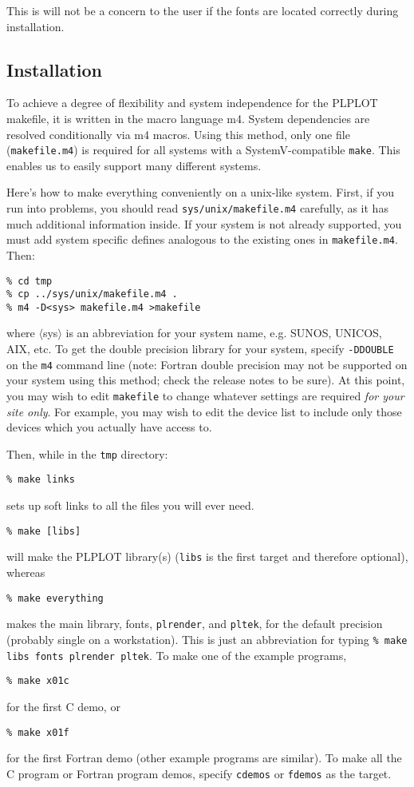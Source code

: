 This is will not be a concern to the user if the fonts are located correctly
during installation.


\subsection{Installation}

To achieve a degree of flexibility and system independence for the PLPLOT
makefile, it is written in the macro language m4.  System dependencies are
resolved conditionally via m4 macros.  Using this method, only one file
({\tt makefile.m4}) is required for all systems with a SystemV-compatible
{\tt make}.  This enables us to easily support many different systems.

Here's how to make everything conveniently on a unix-like system.  First,
if you run into problems, you should read {\tt sys/unix/makefile.m4}
carefully, as it has much additional information inside.  If your system is
not already supported, you must add system specific defines analogous to
the existing ones in {\tt makefile.m4}.  Then: 
\begin{verbatim}
% cd tmp
% cp ../sys/unix/makefile.m4 .
% m4 -D<sys> makefile.m4 >makefile 
\end{verbatim}
where $\langle$sys$\rangle$ is an abbreviation for your system name, e.g.
SUNOS, UNICOS, AIX, etc.  To get the double precision library for your
system, specify {\tt -DDOUBLE} on the {\tt m4} command line (note: Fortran
double precision may not be supported on your system using this method;
check the release notes to be sure).  At this point, you may wish to edit
{\tt makefile} to change whatever settings are required {\em for your site
only}.  For example, you may wish to edit the device list to include only
those devices which you actually have access to. 

Then, while in the {\tt tmp} directory:
%
\begin{verbatim}
% make links
\end{verbatim}
%
sets up soft links to all the files you will ever need.
%
\begin{verbatim}
% make [libs]
\end{verbatim}
%
will make the PLPLOT library(s) ({\tt libs} is the first target and
therefore optional), whereas
%
\begin{verbatim}
% make everything
\end{verbatim}
%
makes the main library, fonts, {\tt plrender}, and {\tt pltek}, for the
default precision (probably single on a workstation).  This is just an
abbreviation for typing {\tt \% make libs fonts plrender pltek}.
To make one of the example programs,
%
\begin{verbatim}
% make x01c
\end{verbatim}
%
for the first C demo, or
%
\begin{verbatim}
% make x01f
\end{verbatim}
%
for the first Fortran demo (other example programs are similar).  To make
all the C program or Fortran program demos, specify {\tt cdemos} or
{\tt fdemos} as the target.

